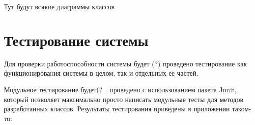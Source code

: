 Тут будут всякие диаграммы классов

\section{Тестирование системы} 
Для проверки работоспособности системы будет (?) проведено тестирование как функционирования системы в целом, так и отдельных ее частей. 

Модульное тестирование будет(?_ проведено с использованием пакета Junit, который позволяет максимально просто написать модульные тесты для методов разработанных классов. Результаты тестирования приведены в приложении таком-то.%

